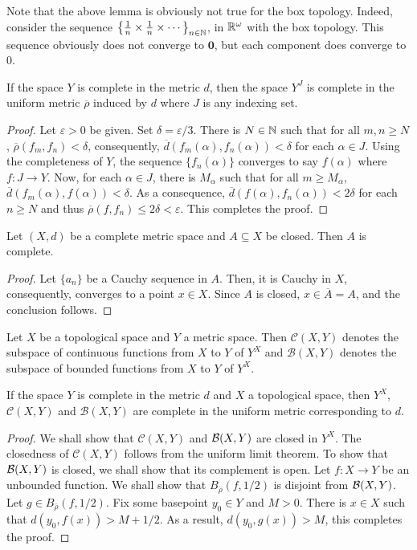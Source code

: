 Note that the above lemma is obviously not true for the box topology. Indeed, consider the sequence $\left\{\frac{1}{n}\times\frac{1}{n}\times\cdots\right\}_{n\in\mathbb{N}}$, in $\mathbb{R}^\omega$ with the box topology. This sequence obviously does not converge to $\mathbf 0$, but each component does converge to $0$.

\begin{theorem}
    If the space $Y$ is complete in the metric $d$, then the space $Y^J$ is complete in the uniform metric $\overline\rho$ induced by $d$ where $J$ is any indexing set.
\end{theorem}
\begin{proof}
    Let $\varepsilon > 0$ be given. Set $\delta = \varepsilon/3$. There is $N\in\mathbb{N}$ such that for all $m,n\ge N$, $\overline{\rho}(f_m, f_n) < \delta$, consequently, $\overline d(f_m(\alpha), f_n(\alpha)) < \delta$ for each $\alpha\in J$. Using the completeness of $Y$, the sequence $\{f_n(\alpha)\}$ converges to say $f(\alpha)$ where $f: J\to Y$. Now, for each $\alpha\in J$, there is $M_\alpha$ such that for all $m\ge M_\alpha$, $\overline d(f_m(\alpha), f(\alpha)) < \delta$. As a consequence, $\overline{d}(f(\alpha), f_n(\alpha)) < 2\delta$ for each $n\ge N$ and thus $\overline\rho(f, f_n)\le 2\delta < \varepsilon$. This completes the proof.
\end{proof}

\begin{proposition}
    Let $(X,d)$ be a complete metric space and $A\subseteq X$ be closed. Then $A$ is complete.
\end{proposition}
\begin{proof}
    Let $\{a_n\}$ be a Cauchy sequence in $A$. Then, it is Cauchy in $X$, consequently, converges to a point $x\in X$. Since $A$ is closed, $x\in\overline A = A$, and the conclusion follows.
\end{proof}

\begin{definition}
    Let $X$ be a topological space and $Y$ a metric space. Then $\mathcal C(X,Y)$ denotes the subspace of continuous functions from $X$ to $Y$ of $Y^X$ and $\mathcal B(X,Y)$ denotes the subspace of bounded functions from $X$ to $Y$ of $Y^X$.
\end{definition}

\begin{theorem}
    If the space $Y$ is complete in the metric $d$ and $X$ a topological space, then $Y^X$, $\mathcal C(X,Y)$ and $\mathcal B(X,Y)$ are complete in the uniform metric corresponding to $d$.
\end{theorem}
\begin{proof}
    We shall show that $\mathcal C(X,Y)$ and $\mathcal{B}(X,Y)$ are closed in $Y^X$. The closedness of $\mathcal C(X,Y)$ follows from the uniform limit theorem. To show that $\mathcal{B}(X,Y)$ is closed, we shall show that its complement is open. Let $f: X\to Y$ be an unbounded function. We shall show that $B_{\overline\rho}(f,1/2)$ is disjoint from $\mathcal{B}(X,Y)$. Let $g\in B_{\overline\rho}(f,1/2)$. Fix some basepoint $y_0\in Y$ and $M > 0$. There is $x\in X$ such that $d(y_0, f(x)) > M + 1/2$. As a result, $d(y_0, g(x)) > M$, this completes the proof.
\end{proof}

